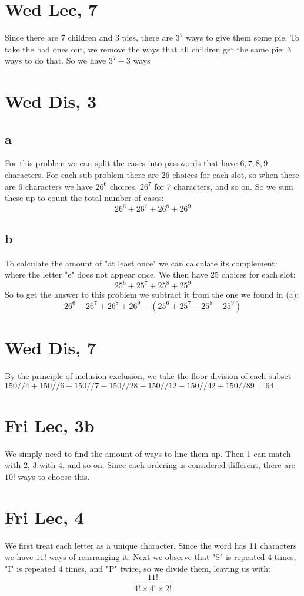 \documentclass[12pt]{article}
\begin{document}
\section{Wed Lec, 7}
Since there are 7 children and 3 pies, there are $3^7$ ways to give them some pie. To take the bad ones out, we remove the ways that all children get the same pie: $3$ ways to do that.
\newline
So we have $3^7-3$ ways

\section{Wed Dis, 3}

\subsection{a}
For this problem we can split the cases into passwords that have $6,7,8,9$ characters. For each sub-problem there are 26 choices for each slot, so when there are 6 characters we have $26^6$ choices, $26^7$ for 7 characters, and so on.
\newline
So we sum these up to count the total number of cases:
$$26^6+26^7+26^8+26^9$$


\subsection{b}
To calculate the amount of "at least once" we can calculate its complement: where the letter "e" does not appear once. We then have 25 choices for each slot:
$$25^6+25^7+25^8+25^9$$
So to get the answer to this problem we subtract it from the one we found in (a):
$$26^6+26^7+26^8+26^9-(25^6+25^7+25^8+25^9)$$

\section{Wed Dis, 7}
By the principle of inclusion exclusion, we take the floor division of each subset $150//4+ 150//6+150//7 - 150//28-150//12-150//42 + 150//89 = 64$


\section{Fri Lec, 3b}
We simply need to find the amount of ways to line them up. Then 1 can match with 2, 3 with 4, and so on. Since each ordering is considered different, there are $10!$ ways to choose this.

\section{Fri Lec, 4}
We first treat each letter as a unique character. Since the word has 11 characters we have $11!$ ways of rearranging it.
\newline
Next we observe that "S" is repeated 4 times, "I" is repeated 4 times, and "P" twice, so we divide them, leaving us with:
\newline
$$\frac{11!}{4!\times4!\times2!}$$
\end{document}
